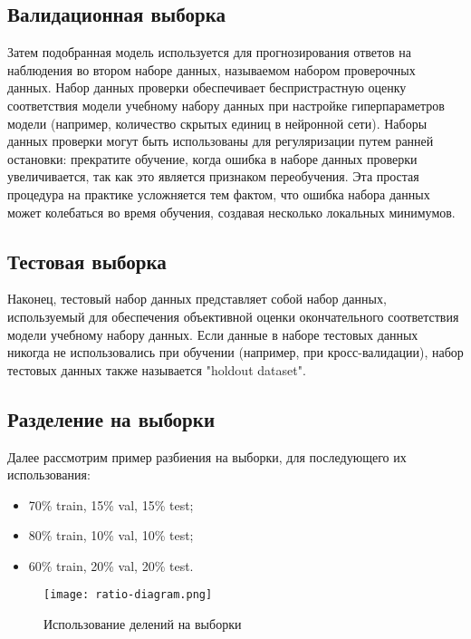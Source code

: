 \subsection{Валидационная выборка}

Затем подобранная модель используется для прогнозирования ответов на наблюдения во втором наборе данных, называемом набором проверочных данных. Набор данных проверки обеспечивает беспристрастную оценку соответствия модели учебному набору данных при настройке гиперпараметров модели (например, количество скрытых единиц в нейронной сети). Наборы данных проверки могут быть использованы для регуляризации путем ранней остановки: прекратите обучение, когда ошибка в наборе данных проверки увеличивается, так как это является признаком переобучения. Эта простая процедура на практике усложняется тем фактом, что ошибка набора данных может колебаться во время обучения, создавая несколько локальных минимумов.

\subsection{Тестовая выборка}

Наконец, тестовый набор данных представляет собой набор данных, используемый для обеспечения объективной оценки окончательного соответствия модели учебному набору данных. Если данные в наборе тестовых данных никогда не использовались при обучении (например, при кросс-валидации), набор тестовых данных также называется "holdout dataset".

\subsection{Разделение на выборки}

Далее рассмотрим пример разбиения на выборки, для последующего их использования:

\begin{itemize}
	\item 70\% train, 15\% val, 15\% test;
	\item 80\% train, 10\% val, 10\% test;
	\item 60\% train, 20\% val, 20\% test.
\end{itemize}

\begin{figure}[h]
\centering
	\texttt{[image: ratio-diagram.png]}
	\caption{Использование делений на выборки}
	\label{sec:purpose:payings}
\end{figure}

